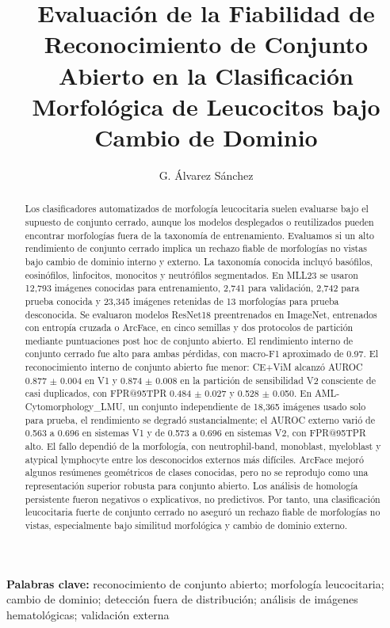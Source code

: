 \documentclass[11pt]{article}
\title{Evaluación de la Fiabilidad de Reconocimiento de Conjunto Abierto en la Clasificación Morfológica de Leucocitos bajo Cambio de Dominio}
\author{G. Álvarez Sánchez}
\date{}
\begin{document}
\maketitle

\begin{abstract}
Los clasificadores automatizados de morfología leucocitaria suelen evaluarse bajo el supuesto de conjunto cerrado, aunque los modelos desplegados o reutilizados pueden encontrar morfologías fuera de la taxonomía de entrenamiento. Evaluamos si un alto rendimiento de conjunto cerrado implica un rechazo fiable de morfologías no vistas bajo cambio de dominio interno y externo. La taxonomía conocida incluyó basófilos, eosinófilos, linfocitos, monocitos y neutrófilos segmentados. En MLL23 se usaron 12,793 imágenes conocidas para entrenamiento, 2,741 para validación, 2,742 para prueba conocida y 23,345 imágenes retenidas de 13 morfologías para prueba desconocida. Se evaluaron modelos ResNet18 preentrenados en ImageNet, entrenados con entropía cruzada o ArcFace, en cinco semillas y dos protocolos de partición mediante puntuaciones post hoc de conjunto abierto. El rendimiento interno de conjunto cerrado fue alto para ambas pérdidas, con macro-F1 aproximado de 0.97. El reconocimiento interno de conjunto abierto fue menor: CE+ViM alcanzó AUROC 0.877 $\pm$ 0.004 en V1 y 0.874 $\pm$ 0.008 en la partición de sensibilidad V2 consciente de casi duplicados, con FPR@95TPR 0.484 $\pm$ 0.027 y 0.528 $\pm$ 0.050. En AML-Cytomorphology\_LMU, un conjunto independiente de 18,365 imágenes usado solo para prueba, el rendimiento se degradó sustancialmente; el AUROC externo varió de 0.563 a 0.696 en sistemas V1 y de 0.573 a 0.696 en sistemas V2, con FPR@95TPR alto. El fallo dependió de la morfología, con neutrophil-band, monoblast, myeloblast y atypical lymphocyte entre los desconocidos externos más difíciles. ArcFace mejoró algunos resúmenes geométricos de clases conocidas, pero no se reprodujo como una representación superior robusta para conjunto abierto. Los análisis de homología persistente fueron negativos o explicativos, no predictivos. Por tanto, una clasificación leucocitaria fuerte de conjunto cerrado no aseguró un rechazo fiable de morfologías no vistas, especialmente bajo similitud morfológica y cambio de dominio externo.
\end{abstract}

\noindent\textbf{Palabras clave:} reconocimiento de conjunto abierto; morfología leucocitaria; cambio de dominio; detección fuera de distribución; análisis de imágenes hematológicas; validación externa
\end{document}
